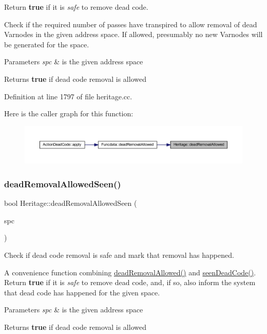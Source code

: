 Return {\bfseries{true}} if it is {\itshape safe} to remove dead code. 

Check if the required number of passes have transpired to allow removal of dead Varnodes in the given address space. If allowed, presumably no new Varnodes will be generated for the space. 
\begin{DoxyParams}{Parameters}
{\em spc} & is the given address space \\
\hline
\end{DoxyParams}
\begin{DoxyReturn}{Returns}
{\bfseries{true}} if dead code removal is allowed 
\end{DoxyReturn}


Definition at line 1797 of file heritage.\+cc.

Here is the caller graph for this function\+:
\nopagebreak
\begin{figure}[H]
\begin{center}
\leavevmode
\includegraphics[width=350pt]{class_heritage_a664720f99b5b26c63a5f0349f4a83a0c_icgraph}
\end{center}
\end{figure}
\mbox{\label{class_heritage_a2bbf92b2085d45de9f3920824a51786c}} 
\subsubsection{\texorpdfstring{deadRemovalAllowedSeen()}{deadRemovalAllowedSeen()}}
{\footnotesize\ttfamily bool Heritage\+::dead\+Removal\+Allowed\+Seen (\begin{DoxyParamCaption}\item[{\mbox{\hyperlink{class_addr_space}{Addr\+Space}} $\ast$}]{spc }\end{DoxyParamCaption})}



Check if dead code removal is safe and mark that removal has happened. 

A convenience function combining \mbox{\hyperlink{class_heritage_a664720f99b5b26c63a5f0349f4a83a0c}{dead\+Removal\+Allowed()}} and \mbox{\hyperlink{class_heritage_abbcd7a583bd605db1177b9c2e0be599f}{seen\+Dead\+Code()}}. Return {\bfseries{true}} if it is {\itshape safe} to remove dead code, and, if so, also inform the system that dead code has happened for the given space. 
\begin{DoxyParams}{Parameters}
{\em spc} & is the given address space \\
\hline
\end{DoxyParams}
\begin{DoxyReturn}{Returns}
{\bfseries{true}} if dead code removal is allowed 
\end{DoxyReturn}


